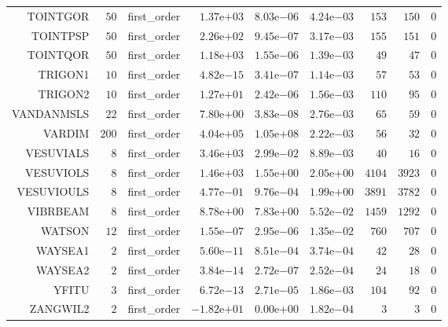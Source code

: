 \begin{longtable}{rrrrrrrrr}
TOINTGOR & \(    50\) & first\_order & \( 1.37\)e\(+03\) & \( 8.03\)e\(-06\) & \( 4.24\)e\(-03\) & \(   153\) & \(   150\) & \(     0\) \\
TOINTPSP & \(    50\) & first\_order & \( 2.26\)e\(+02\) & \( 9.45\)e\(-07\) & \( 3.17\)e\(-03\) & \(   155\) & \(   151\) & \(     0\) \\
TOINTQOR & \(    50\) & first\_order & \( 1.18\)e\(+03\) & \( 1.55\)e\(-06\) & \( 1.39\)e\(-03\) & \(    49\) & \(    47\) & \(     0\) \\
TRIGON1 & \(    10\) & first\_order & \( 4.82\)e\(-15\) & \( 3.41\)e\(-07\) & \( 1.14\)e\(-03\) & \(    57\) & \(    53\) & \(     0\) \\
TRIGON2 & \(    10\) & first\_order & \( 1.27\)e\(+01\) & \( 2.42\)e\(-06\) & \( 1.56\)e\(-03\) & \(   110\) & \(    95\) & \(     0\) \\
VANDANMSLS & \(    22\) & first\_order & \( 7.80\)e\(+00\) & \( 3.83\)e\(-08\) & \( 2.76\)e\(-03\) & \(    65\) & \(    59\) & \(     0\) \\
VARDIM & \(   200\) & first\_order & \( 4.04\)e\(+05\) & \( 1.05\)e\(+08\) & \( 2.22\)e\(-03\) & \(    56\) & \(    32\) & \(     0\) \\
VESUVIALS & \(     8\) & first\_order & \( 3.46\)e\(+03\) & \( 2.99\)e\(-02\) & \( 8.89\)e\(-03\) & \(    40\) & \(    16\) & \(     0\) \\
VESUVIOLS & \(     8\) & first\_order & \( 1.46\)e\(+03\) & \( 1.55\)e\(+00\) & \( 2.05\)e\(+00\) & \(  4104\) & \(  3923\) & \(     0\) \\
VESUVIOULS & \(     8\) & first\_order & \( 4.77\)e\(-01\) & \( 9.76\)e\(-04\) & \( 1.99\)e\(+00\) & \(  3891\) & \(  3782\) & \(     0\) \\
VIBRBEAM & \(     8\) & first\_order & \( 8.78\)e\(+00\) & \( 7.83\)e\(+00\) & \( 5.52\)e\(-02\) & \(  1459\) & \(  1292\) & \(     0\) \\
WATSON & \(    12\) & first\_order & \( 1.55\)e\(-07\) & \( 2.95\)e\(-06\) & \( 1.35\)e\(-02\) & \(   760\) & \(   707\) & \(     0\) \\
WAYSEA1 & \(     2\) & first\_order & \( 5.60\)e\(-11\) & \( 8.51\)e\(-04\) & \( 3.74\)e\(-04\) & \(    42\) & \(    28\) & \(     0\) \\
WAYSEA2 & \(     2\) & first\_order & \( 3.84\)e\(-14\) & \( 2.72\)e\(-07\) & \( 2.52\)e\(-04\) & \(    24\) & \(    18\) & \(     0\) \\
YFITU & \(     3\) & first\_order & \( 6.72\)e\(-13\) & \( 2.71\)e\(-05\) & \( 1.86\)e\(-03\) & \(   104\) & \(    92\) & \(     0\) \\
ZANGWIL2 & \(     2\) & first\_order & \(-1.82\)e\(+01\) & \( 0.00\)e\(+00\) & \( 1.82\)e\(-04\) & \(     3\) & \(     3\) & \(     0\) \\\hline
\end{longtable}
